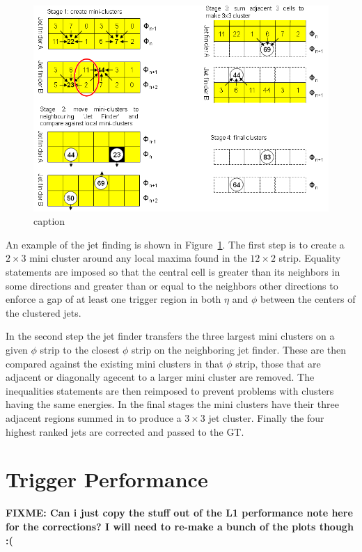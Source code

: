\begin{figure}[ht]
  \centering
 \includegraphics[width=\textwidth]{figures/LoneTrigger/jetfinderfunction.png}
  \caption{caption}
  \label{fig:figures_LoneTrigger_jetfinderfunction}
\end{figure}


An example of the jet finding is shown in
Figure~\ref{fig:figures_LoneTrigger_jetfinderfunction}. The first step
is to create a $2 \times 3$ mini cluster around any local maxima found in the 
$12 \times 2$ strip. Equality statements are imposed so that the central cell
is greater than its neighbors in some directions and greater than or equal to
the neighbors other directions to enforce a gap of at least one trigger region
in both $\eta$ and $\phi$ between the centers of the clustered jets.

In the second step the jet finder transfers the three largest mini clusters on 
a given $\phi$ strip to the closest $\phi$ strip on the neighboring jet finder.
These are then compared against the existing mini clusters in that $\phi$ strip,
those that are adjacent or diagonally agecent to a larger mini cluster are 
removed. The inequalities statements are then reimposed to prevent problems
with clusters having the same energies. In the final stages the mini clusters
have their three adjacent regions summed in to produce a $3 \times 3$ jet
cluster. Finally the four highest ranked jets are corrected and passed to the 
GT.




\section{\Lone Trigger Performance} %
\label{sec:lone_trigger_performance}
\textbf{FIXME: Can i just copy the stuff out of the L1 performance note here 
for the corrections? I will need to re-make a bunch of the plots though :(}

